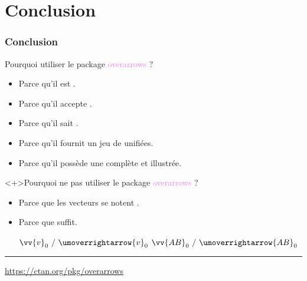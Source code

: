 \documentclass[10pt, aspectratio=3218]{beamer}
\newcommand*{\pkg}[1]{\textcolor{violet}{\textsf{#1}}}
\begin{document}
\section{Conclusion}

\let\overrightarrow\umoverrightarrow
{}

\begin{frame}[fragile]

\frametitle{Conclusion}

\begin{block}{Pourquoi utiliser le package \pkg{overarrows} ?}
\begin{itemize}
 \item Parce qu'il est .
 \item Parce qu'il accepte .
 \item Parce qu'il sait .
 \item Parce qu'il fournit un jeu de  unifiées.
 \item Parce qu'il possède une  complète et illustrée.
\end{itemize}
\end{block}

\begin{alertblock}<+>{Pourquoi ne pas utiliser le package \pkg{overarrows} ?}
\begin{itemize}
 \item Parce que les vecteurs se notent .
 \item Parce que \structure{\pkg{unicode-math}} suffit.
  \begin{dispExample}
$ \vv{v}_0 ~/~ \overrightarrow{v}_0 $ \qquad
$ \vv{AB}_0 ~/~ \overrightarrow{AB}_0 $
  \end{dispExample}
\end{itemize}
\end{alertblock}

\begin{center}
  \rule{6cm}{0.4pt}

  \url{https://ctan.org/pkg/overarrows}
\end{center}

\end{frame}
\end{document}
